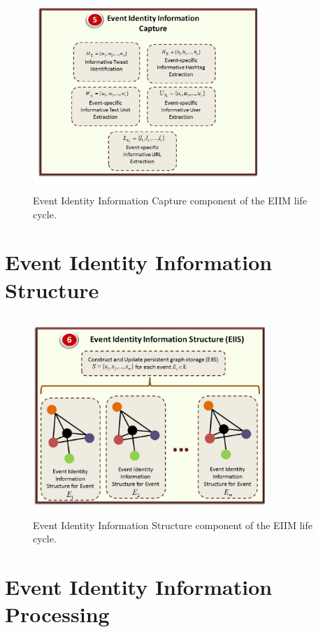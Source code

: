 \begin{figure}[htbp]
  \caption{Event Identity Information Capture component of the EIIM life cycle.}
  \centering
    \includegraphics[width=8.8cm,height=7.5cm]{Figures/EIIMComponents/EventIdentityInformationCapture.jpg}
\end{figure}

\section{Event Identity Information Structure}

\begin{figure}[htbp]
  \caption{Event Identity Information Structure component of the EIIM life cycle.}
  \centering
    \includegraphics[width=8.8cm,height=7.5cm]{Figures/EIIMComponents/EventIdentityInformationStructure.jpg}
\end{figure}

\section{Event Identity Information Processing}

